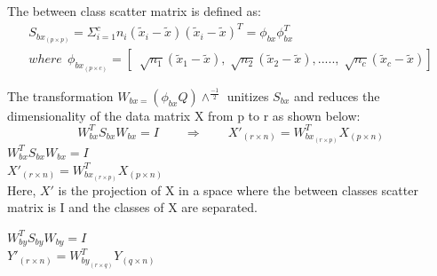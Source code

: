 \documentclass{article}
\begin{document}
The between class scatter matrix is defined as:\\
\begin{gather*}
S_{bx_{(p\times p)}} = \Sigma_{i=1}^c n_i(\tilde{x}_i - \tilde{x})(\tilde{x}_i - \tilde{x})^T = \phi_{bx}\phi_{bx}^T\\
where ~~ \phi_{bx_{(p \times c)}} = [~ \sqrt[]{n_1} 
 (\tilde {x}_1 - \tilde x),\sqrt[]{n_2} (\tilde x_2 - \tilde x ),.....,\sqrt[]{n_c} ( \tilde x_c - \tilde x ) ]
\end{gather*}

The transformation $W_{bx = }(\phi_{bx}Q)\wedge^{\frac{-1}{2}}$ unitizes $S_{bx}$ 
and reduces the dimensionality of the data matrix X from p to r as shown below:\\
\begin{equation*}
  W_{bx}^T S_{bx}W_{bx} = I \qquad\text{$\Rightarrow$}\qquad X'_{(r \times n)} = W_{bx_{(r \times p)}}^TX_{(p \times n)}
\end{equation*}
\iffalse
$W_{bx}^T S_{bx}W_{bx} = I$\\$X'_{(r \times n)} = W_{bx_{(r \times p)}}^TX_{(p \times n)} $\\

Here, $X'$ is the projection of X in a space where the between classes scatter
matrix is I and the classes of X are separated. 

$W_{by}^T S_{by}W_{by} = I$\\$Y'_{(r \times n)} = W_{by_{(r \times q)}}^TY_{(q \times n)} $
\end{document}
